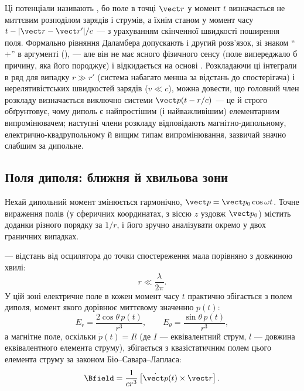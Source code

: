 \begin{Attention}
	Ці потенціали називають , бо поле в точці $\vect r$ у момент $t$ визначається не миттєвим розподілом зарядів і струмів, а
	їхнім станом у  момент часу $t-|\vect r-\vect r'|/c$ --- з урахуванням скінченної швидкості поширення поля. Формально
	рівняння Даламбера допускають і другий розв'язок, зі знаком \enquote{$+$} в аргументі (), --- але він не має
	ясного фізичного сенсу (поле випереджало б причину, яка його породжує) і відкидається на основі . Розкладаючи ці інтеграли
	в ряд для випадку $r\gg r'$ (система набагато менша за відстань до спостерігача) і нерелятивістських швидкостей зарядів ($v\ll c$), можна
	довести, що головний член розкладу визначається виключно  системи $\vect p(t-r/c)$ --- це й строго обґрунтовує, чому
	диполь є найпростішим (і найважливішим) елементарним випромінювачем; наступні члени розкладу відповідають магнітно-дипольному,
	електрично-квадрупольному й вищим типам випромінювання, зазвичай значно слабшим за дипольне.
\end{Attention}

\subsection*{Поля диполя: ближня й хвильова зони}

Нехай дипольний момент змінюється гармонічно, $\vect p = \vect p_0\cos\omega t$. Точне вираження полів (у сферичних координатах, з віссю $z$
уздовж $\vect p_0$) містить доданки різного порядку за $1/r$, і його зручно аналізувати окремо у двох граничних випадках.

 --- відстань від осцилятора до точки спостереження мала порівняно з довжиною хвилі:
\begin{equation}\label{eq:NearZoneCondition}
	r \ll \frac\lambda{2\pi}.
\end{equation}
У цій зоні електричне поле в кожен момент часу $t$ практично збігається з полем  диполя, момент якого дорівнює миттєвому
значенню $p(t)$:
\begin{equation}\label{eq:NearZoneE}
	E_r = \frac{2\cos\theta\, p(t)}{r^3}, \qquad E_\theta = \frac{\sin\theta\, p(t)}{r^3},
\end{equation}
а магнітне поле, оскільки $\dot p(t) = Il$ (де $I$ --- еквівалентний струм, $l$ --- довжина еквівалентного елемента струму), збігається з
квазістатичним полем цього елемента струму за законом Біо--Савара--Лапласа:
\begin{equation}\label{eq:NearZoneB}
	\Bfield = \frac1{cr^3}\left[\dot{\vect p}(t)\times\vect r\right].
\end{equation}

